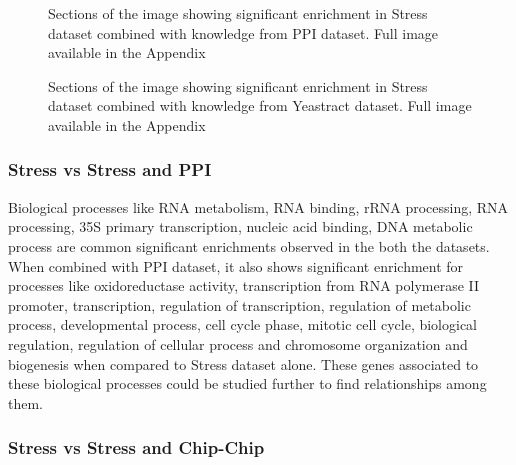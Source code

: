 \begin{figure}[p]
\centering
{}
\label{fig:stress_ppi_enrich}
\caption[]{Sections of the image showing significant enrichment in Stress dataset combined with knowledge from PPI dataset. Full image available in the Appendix}
\end{figure}

\begin{figure}[p]
\centering
{}
\label{fig:stress_ppi_enrich}
\caption[]{Sections of the image showing significant enrichment in Stress dataset combined with knowledge from Yeastract dataset. Full image available in the Appendix}
\end{figure}

\subsubsection{Stress vs Stress and PPI}

Biological processes like RNA metabolism, RNA binding, rRNA processing, RNA processing, 35S primary transcription, nucleic acid binding, DNA metabolic process are common 
significant enrichments observed in the both the datasets. When combined with PPI dataset, it also shows significant enrichment for processes like oxidoreductase activity, 
transcription from RNA polymerase II promoter, transcription, regulation of transcription, regulation of metabolic process, developmental process, cell cycle phase, 
mitotic cell cycle, biological regulation, regulation of cellular process and chromosome organization and biogenesis when compared to Stress dataset alone. These genes associated to these
biological processes could be studied further to find relationships among them.

\subsubsection{Stress vs Stress and Chip-Chip}

